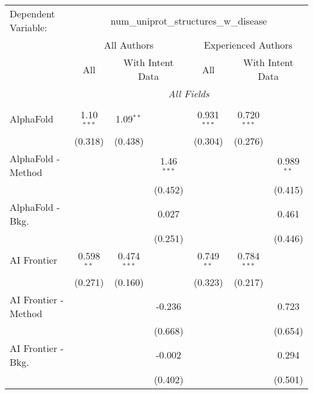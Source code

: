 \begingroup
\centering
\begin{tabular}{lcccccc}
   \tabularnewline \midrule \midrule
   Dependent Variable: & \multicolumn{6}{c}{num\_uniprot\_structures\_w\_disease}\\
 & \multicolumn{3}{c}{All Authors} & \multicolumn{3}{c}{Experienced Authors} \\
\cmidrule(lr){2-4} \cmidrule(lr){5-7}
 & \multicolumn{1}{c}{All} & \multicolumn{2}{c}{With Intent Data} & \multicolumn{1}{c}{All} & \multicolumn{2}{c}{With Intent Data} \\
\cmidrule(lr){2-2} \cmidrule(lr){3-4} \cmidrule(lr){5-5} \cmidrule(lr){6-7}
 & \multicolumn{6}{c}{\textit{All Fields}} \\ \\
   AlphaFold            & 1.10$^{***}$ & 1.09$^{**}$   &              & 0.931$^{***}$ & 0.720$^{***}$ &   \\   
                        & (0.318)      & (0.438)       &              & (0.304)       & (0.276)       &   \\   
   AlphaFold - Method   &              &               & 1.46$^{***}$ &               &               & 0.989$^{**}$\\   
                        &              &               & (0.452)      &               &               & (0.415)\\   
   AlphaFold - Bkg.     &              &               & 0.027        &               &               & 0.461\\   
                        &              &               & (0.251)      &               &               & (0.446)\\   
   AI Frontier          & 0.598$^{**}$ & 0.474$^{***}$ &              & 0.749$^{**}$  & 0.784$^{***}$ &   \\   
                        & (0.271)      & (0.160)       &              & (0.323)       & (0.217)       &   \\   
   AI Frontier - Method &              &               & -0.236       &               &               & 0.723\\   
                        &              &               & (0.668)      &               &               & (0.654)\\   
   AI Frontier - Bkg.   &              &               & -0.002       &               &               & 0.294\\   
                        &              &               & (0.402)      &               &               & (0.501)\\   

\end{tabular}
